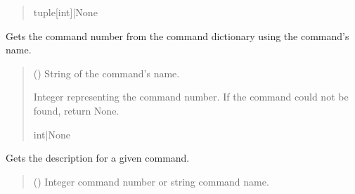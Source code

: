 \documentclass[letterpaper,10pt,english]{sphinxmanual}
\begin{document}
\begin{fulllineitems}
\begin{fulllineitems}
\begin{quote}
\begin{description}
\sphinxAtStartPar
tuple{[}int{]}|None

\end{description}\end{quote}

\end{fulllineitems}


\begin{fulllineitems}
\label{\detokenize{Morelia.Commands:Morelia.Commands.PodCommands.CommandSet.CommandNumberFromName}}
\pysigstartsignatures
{}
\pysigstopsignatures
\sphinxAtStartPar
Gets the command number from the command dictionary using the command’s name.
\begin{quote}\begin{description}
\sphinxAtStartPar
{} () \textendash{} String of the command’s name.

\sphinxAtStartPar
Integer representing the command number. If the command could not be found,                 return None.

\sphinxAtStartPar
int|None

\end{description}\end{quote}

\end{fulllineitems}


\begin{fulllineitems}
\label{\detokenize{Morelia.Commands:Morelia.Commands.PodCommands.CommandSet.Description}}
\pysigstartsignatures
{}
\pysigstopsignatures
\sphinxAtStartPar
Gets the description for a given command.
\begin{quote}\begin{description}
\sphinxAtStartPar
{} (\sphinxstyleliteralemphasis{\sphinxupquote{ | }}) \textendash{} Integer command number or string command name.


\end{description}
\end{quote}
\end{fulllineitems}
\end{fulllineitems}
\end{document}
